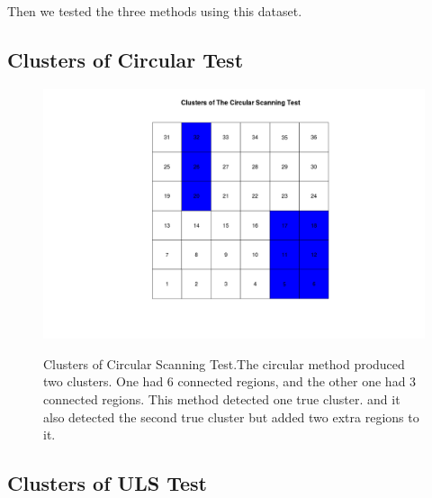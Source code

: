 \documentclass[12pt]{article}
\begin{document}
	Then we tested the three methods using this dataset. \\
	
\subsection{Clusters of Circular Test } 
	 
	 \begin{figure}[!ht]
	 	
	 	\centering
	 	\includegraphics[scale=0.2]{Ex1_Circular}\\
	 	\caption{Clusters of Circular Scanning Test.The circular method produced two clusters. One had 6 connected regions, and the other one had 3 connected regions. This method detected one true cluster. and it also detected the second true cluster but added two extra regions to it.\label{f:gull}}
	 	
	 \end{figure}
	 
	 
\subsection{Clusters of ULS Test}
		
	
	
\end{document}
